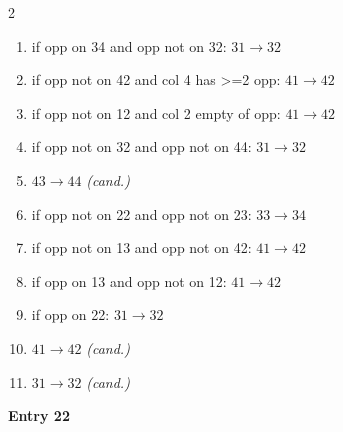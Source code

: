 \begin{multicols}{2}
\begin{tikzpicture}[scale=0.24]
\end{tikzpicture}
\nopagebreak\begin{enumerate}[topsep=1pt,itemsep=0pt,parsep=0pt,leftmargin=2.2em,label=\arabic*.]
\item if opp on 34 and opp not on 32: $31\!\to\!32$
\item if opp not on 42 and col 4 has >=2 opp: $41\!\to\!42$
\item if opp not on 12 and col 2 empty of opp: $41\!\to\!42$
\item if opp not on 32 and opp not on 44: $31\!\to\!32$
\item $43\!\to\!44$ \hfill\textit{(cand.)}
\item if opp not on 22 and opp not on 23: $33\!\to\!34$
\item if opp not on 13 and opp not on 42: $41\!\to\!42$
\item if opp on 13 and opp not on 12: $41\!\to\!42$
\item if opp on 22: $31\!\to\!32$
\item $41\!\to\!42$ \hfill\textit{(cand.)}
\item $31\!\to\!32$ \hfill\textit{(cand.)}
\end{enumerate}\smallskip
\noindent\textbf{Entry 22} \; 
\end{multicols}
